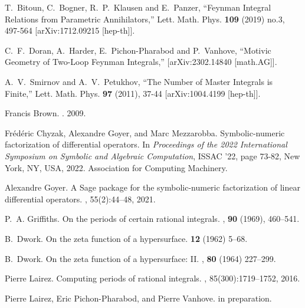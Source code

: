 \documentclass[a4paper,12pt]{article}
\numberwithin{equation}{section}
\numberwithin{figure}{section}
\begin{document}
\begin{thebibliography}{99}
  
T.~Bitoun, C.~Bogner, R.~P.~Klausen and E.~Panzer,
``Feynman Integral Relations from Parametric Annihilators,''
Lett. Math. Phys. \textbf{109} (2019) no.3, 497-564
[arXiv:1712.09215 [hep-th]].

C.~F.~Doran, A.~Harder, E.~Pichon-Pharabod and P.~Vanhove,
``Motivic Geometry of Two-Loop Feynman Integrals,''
[arXiv:2302.14840 [math.AG]].

A.~V.~Smirnov and A.~V.~Petukhov,
``The Number of Master Integrals is Finite,''
Lett. Math. Phys. \textbf{97} (2011), 37-44
[arXiv:1004.4199 [hep-th]].



Francis Brown.
.
 2009.
\newblock [arXiv:0910.0114]  

Fr\'{e}d\'{e}ric Chyzak, Alexandre Goyer, and Marc Mezzarobba.
\newblock Symbolic-numeric factorization of differential operators.
\newblock In {\em Proceedings of the 2022 International Symposium on Symbolic
  and Algebraic Computation}, ISSAC '22, page 73-82, New York, NY, USA, 2022.
Association for Computing Machinery.
\newblock [arXiv:2205.08991]

Alexandre Goyer.
\newblock A {S}age package for the symbolic-numeric factorization of linear
  differential operators.
, 55(2):44--48,
2021.


P.~A. Griffiths.
\newblock On the periods of certain rational integrals.
, {\bf 90} (1969), 460--541.

B.~Dwork.
\newblock On the zeta function of a hypersurface.
 {\bf 12} (1962) 5--68.

B.~Dwork.
\newblock On the zeta function of a hypersurface: {{II}}.
, {\bf 80} (1964) 227--299.

Pierre Lairez.
\newblock Computing periods of rational integrals.
, 85(300):1719--1752, 2016.
\newblock [arXiv:1404.5069]

Pierre Lairez, Eric Pichon-Pharabod, and Pierre Vanhove.
\newblock in preparation.




\end{thebibliography}
\end{document}
